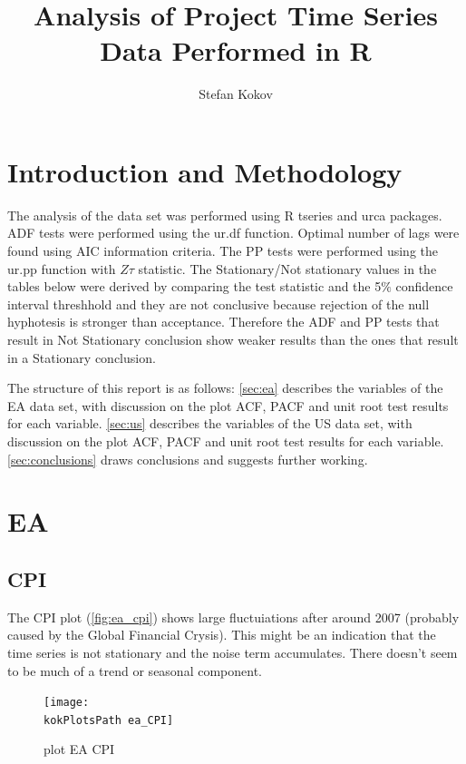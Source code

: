\documentclass[10pt]{article}
\title{Analysis of Project Time Series Data Performed in R}
\author{Stefan Kokov}
\def \kokPlotsPath {../plots/}
\begin{document}
\maketitle



\section{Introduction and Methodology}
The analysis of the data set was performed using R tseries and urca packages.
ADF tests were performed using the ur.df function. Optimal number of lags were found using AIC information criteria. The PP tests were performed using the ur.pp function with $Z\tau$ statistic. The Stationary/Not stationary values in the tables below were derived by comparing the test statistic and the 5$\%$ confidence interval threshhold and they are not conclusive because rejection of the null hyphotesis is stronger than acceptance. Therefore the ADF and PP tests that result in Not Stationary conclusion show weaker results than the ones that result in a Stationary conclusion.

The structure of this report is as follows: \autoref{sec:ea} describes the variables of the EA data set, with discussion on the plot ACF, PACF and unit root test results for each variable. \autoref{sec:us} describes the variables of the US data set, with discussion on the plot ACF, PACF and unit root test results for each variable. \autoref{sec:conclusions} draws conclusions and suggests further working.



\pagebreak



\section{EA}
\label{sec:ea}


\subsection{CPI}
The CPI plot (\autoref{fig:ea_cpi}) shows large fluctuiations after around 2007 (probably caused by the Global Financial Crysis). This might be an indication that the time series is not stationary and the noise term accumulates. There doesn't seem to be much of a trend or seasonal component.

\begin{figure}[h!]
\centering
\texttt{[image: \\kokPlotsPath ea\_CPI]}
\caption{plot EA CPI}
\label{fig:ea_cpi}
\end{figure}
\end{document}
